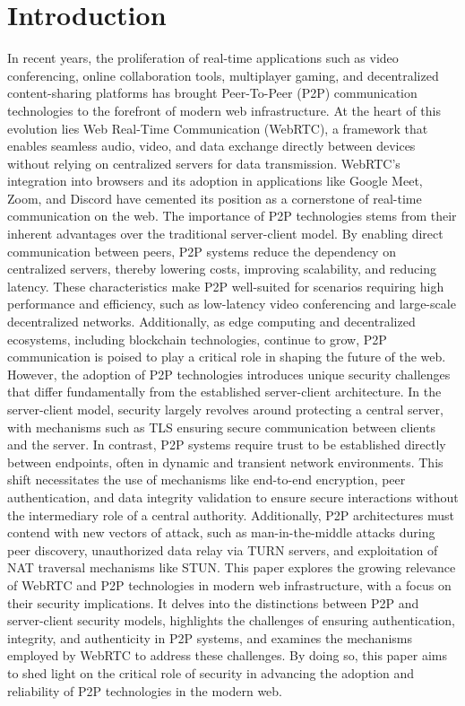 \documentclass[conference]{IEEEtran}
\begin{document}
\section{Introduction}
In recent years, the proliferation of real-time applications such as video conferencing, online collaboration tools, multiplayer gaming, 
and decentralized content-sharing platforms has brought Peer-To-Peer (P2P) communication technologies to the forefront of modern web 
infrastructure. At the heart of this evolution lies Web Real-Time Communication (WebRTC), a framework that enables seamless audio, video,
and data exchange directly between devices without relying on centralized servers for data transmission. WebRTC's integration into browsers and 
its adoption in applications like Google Meet, Zoom, and Discord have cemented its position as a cornerstone of real-time communication on the web. \cite{Statista_Zoom}
The importance of P2P technologies stems from their inherent advantages over the traditional server-client model. By enabling direct communication 
between peers, P2P systems reduce the dependency on centralized servers, thereby lowering costs, improving scalability, and reducing latency. \cite{systematic_review_of_webrtc}
These characteristics make P2P well-suited for scenarios requiring high performance and efficiency, such as low-latency video conferencing 
and large-scale decentralized networks. Additionally, as edge computing and decentralized ecosystems, including blockchain technologies, continue 
to grow, P2P communication is poised to play a critical role in shaping the future of the web. \cite{9297333}
However, the adoption of P2P technologies 
introduces unique security challenges that differ fundamentally from the established server-client architecture. In the server-client model,
security largely revolves around protecting a central server, with mechanisms such as TLS ensuring secure communication between clients and
the server. In contrast, P2P systems require trust to be established directly between endpoints, often in dynamic and transient network 
environments. This shift necessitates the use of mechanisms like end-to-end encryption, peer authentication, and data integrity validation to
ensure secure interactions without the intermediary role of a central authority. Additionally, P2P architectures must contend with new vectors
of attack, such as man-in-the-middle attacks during peer discovery, unauthorized data relay via TURN servers, and exploitation of NAT traversal
mechanisms like STUN. This paper explores the growing relevance of WebRTC and P2P technologies in modern web infrastructure, with a focus on 
their security implications. It delves into the distinctions between P2P and server-client security models, highlights the challenges of ensuring 
authentication, integrity, and authenticity in P2P systems, and examines the mechanisms employed by WebRTC to address these challenges. By doing so, 
this paper aims to shed light on the critical role of security in advancing the adoption and reliability of P2P technologies in the modern web.
\end{document}
